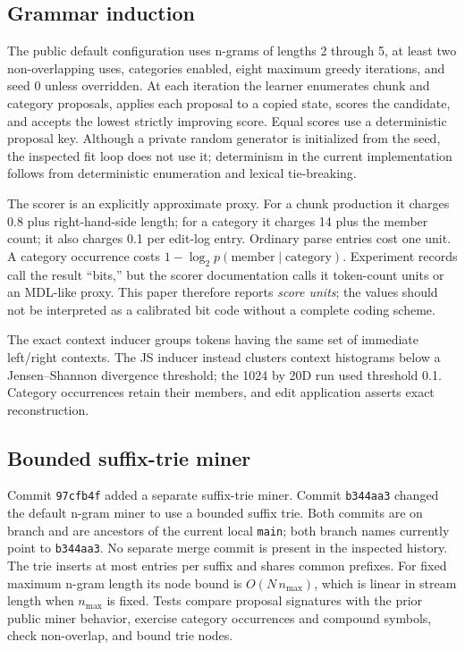 \documentclass[11pt]{article}
\begin{document}
\subsection{Grammar induction}

The public default configuration uses n-grams of lengths 2 through 5, at least
two non-overlapping uses, categories enabled, eight maximum greedy iterations,
and seed 0 unless overridden. At each iteration the learner enumerates chunk
and category proposals, applies each proposal to a copied state, scores the
candidate, and accepts the lowest strictly improving score. Equal scores use a
deterministic proposal key. Although a private random generator is initialized
from the seed, the inspected fit loop does not use it; determinism in the
current implementation follows from deterministic enumeration and lexical
tie-breaking.

The scorer is an explicitly approximate proxy. For a chunk production it
charges 0.8 plus right-hand-side length; for a category it charges 14 plus the
member count; it also charges 0.1 per edit-log entry. Ordinary parse entries
cost one unit. A category occurrence costs
$1-\log_2 p(\mathrm{member}\mid\mathrm{category})$. Experiment records call the
result ``bits,'' but the scorer documentation calls it token-count units or an
MDL-like proxy. This paper therefore reports \emph{score units}; the values
should not be interpreted as a calibrated bit code without a complete coding
scheme.

The exact context inducer groups tokens having the same set of immediate
left/right contexts. The JS inducer instead clusters context histograms below a
Jensen--Shannon divergence threshold; the 1024 by 20D run used threshold 0.1.
Category occurrences retain their members, and edit application asserts exact
reconstruction.

\subsection{Bounded suffix-trie miner}

Commit \texttt{97cfb4f} added a separate suffix-trie miner. Commit
\texttt{b344aa3} changed the default n-gram miner to use a bounded suffix trie.
Both commits are on branch
 and are ancestors of the current local
\texttt{main}; both branch names
currently point to \texttt{b344aa3}. No separate merge commit is present in the
inspected history. The trie inserts at most  entries per
suffix and shares common prefixes. For fixed maximum n-gram length its node
bound is $O(N\,n_{\max})$, which is linear in stream length when $n_{\max}$ is
fixed. Tests compare proposal signatures with the prior public miner behavior,
exercise category occurrences and compound symbols, check non-overlap, and
bound trie nodes.
\end{document}
